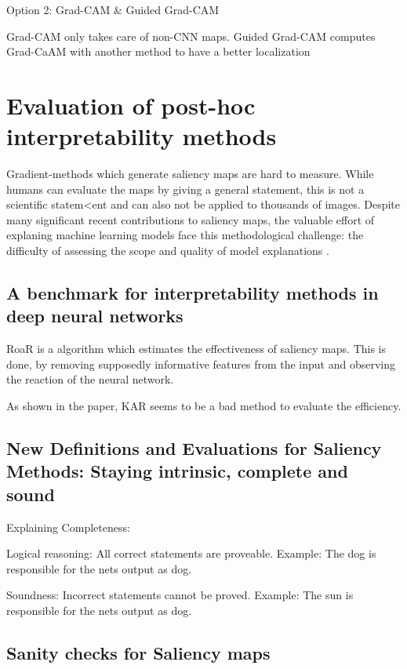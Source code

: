 Option 2: Grad-CAM \& Guided Grad-CAM

Grad-CAM only takes care of non-CNN maps.
Guided Grad-CAM computes Grad-CaAM with another method to have a better localization




\chapter{Evaluation of post-hoc interpretability methods}

Gradient-methods which generate saliency maps are hard to measure. While humans can evaluate the maps by giving a general statement, this is not a scientific statem<ent and can also not be applied to thousands of images. Despite many significant recent contributions to saliency maps, the valuable effort of explaning machine learning models face this methodological challenge: the difficulty of assessing the scope and quality of model explanations \cite{adebayo2020sanity}.


\section{A benchmark for interpretability methods in deep neural networks}

RoaR is a algorithm which estimates the effectiveness of saliency maps. This is done, by removing supposedly informative features from the input and observing the reaction of the neural network.

As shown in the paper, KAR seems to be a bad method to evaluate the efficiency.


\section{New Definitions and Evaluations for Saliency Methods: Staying intrinsic, complete and sound \cite{gupta2022new}}



Explaining Completeness:

Logical reasoning: All correct statements are proveable. Example: The dog is responsible for the nets output as 
dog. 

Soundness: Incorrect statements cannot be proved. Example: The sun is responsible for the nets output as dog.




\section{Sanity checks for Saliency maps}




